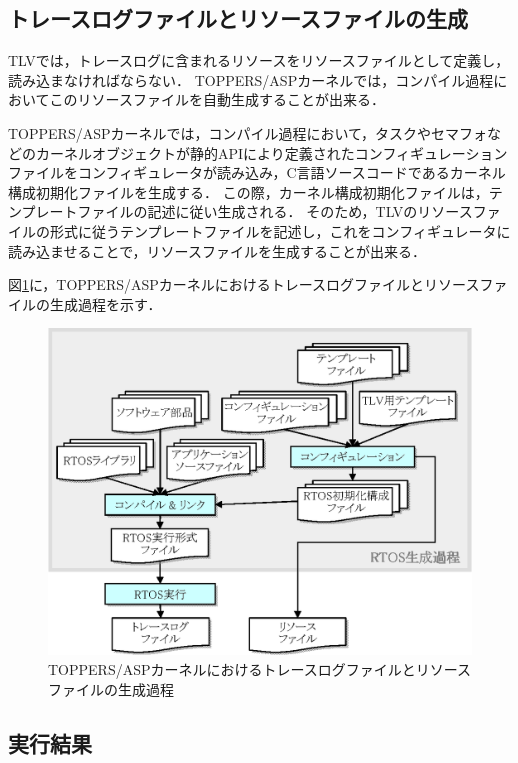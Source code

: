 \subsection{トレースログファイルとリソースファイルの生成}

TLVでは，トレースログに含まれるリソースをリソースファイルとして定義し，読み込まなければならない．
TOPPERS/ASPカーネルでは，コンパイル過程においてこのリソースファイルを自動生成することが出来る．

TOPPERS/ASPカーネルでは，コンパイル過程において，タスクやセマフォなどのカーネルオブジェクトが静的APIにより定義されたコンフィギュレーションファイルをコンフィギュレータが読み込み，C言語ソースコードであるカーネル構成初期化ファイルを生成する．
この際，カーネル構成初期化ファイルは，テンプレートファイルの記述に従い生成される．
そのため，TLVのリソースファイルの形式に従うテンプレートファイルを記述し，これをコンフィギュレータに読み込ませることで，リソースファイルを生成することが出来る．

図\ref{fig:rtosMakeProcess}に，TOPPERS/ASPカーネルにおけるトレースログファイルとリソースファイルの生成過程を示す．

\begin{figure}[tb]
\begin{center}
\includegraphics[scale=0.9]{img/rtosMakeProcess.eps}
\caption{TOPPERS/ASPカーネルにおけるトレースログファイルとリソースファイルの生成過程}
\label{fig:rtosMakeProcess}
\end{center}
\end{figure}

\subsection{実行結果}

